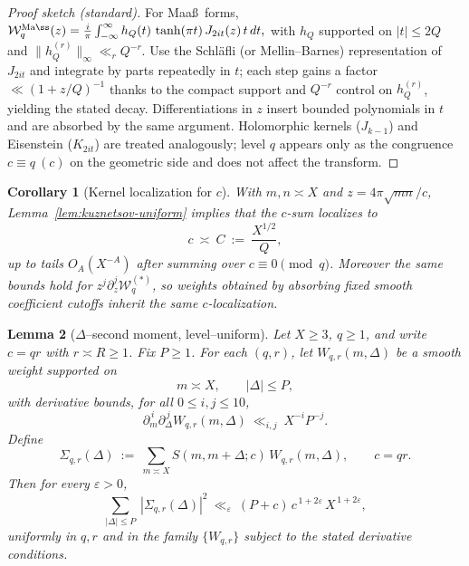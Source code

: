 \documentclass[11pt]{article}
\newtheorem{lemma}{Lemma}[part]
\newtheorem{corollary}[lemma]{Corollary}
\theoremstyle{definition}
\theoremstyle{remark}
\numberwithin{equation}{part}
\begin{document}
\begin{proof}[Proof sketch (standard)]
	For Maa\ss\ forms,
	\(
	\mathcal W_q^{\mathrm{Ma\ss}}(z)=\frac{i}{\pi}\int_{-\infty}^{\infty} h_Q(t)\,\tanh(\pi t)\,J_{2it}(z)\,t\,dt,
	\)
	with $h_Q$ supported on $|t|\le 2Q$ and $\|h_Q^{(r)}\|_\infty\ll_r Q^{-r}$.
	Use the Schl\"afli (or Mellin–Barnes) representation of $J_{2it}$ and integrate by parts repeatedly in $t$;
	each step gains a factor $\ll (1+z/Q)^{-1}$ thanks to the compact support and $Q^{-r}$ control on $h_Q^{(r)}$,
	yielding the stated decay. Differentiations in $z$ insert bounded polynomials in $t$ and are absorbed by the same argument.
	Holomorphic kernels ($J_{k-1}$) and Eisenstein ($K_{2it}$) are treated analogously; level $q$ appears only as the congruence $c\equiv q\ (c)$ on the geometric side and does not affect the transform.
\end{proof}

\begin{corollary}[Kernel localization for $c$]\label{cor:kernel-localization}
	With $m,n\asymp X$ and $z=4\pi\sqrt{mn}/c$, Lemma~\ref{lem:kuznetsov-uniform} implies that the $c$-sum localizes to
	\[
		c\ \asymp\ C\ :=\ \frac{X^{1/2}}{Q},
	\]
	up to tails $O_A(X^{-A})$ after summing over $c\equiv0\pmod q$.
	Moreover the same bounds hold for $z^j\partial_z^j\mathcal W_q^{(*)}$, so weights obtained by absorbing fixed smooth coefficient cutoffs inherit the same $c$-localization.
\end{corollary}




\begin{lemma}[{\boldmath $\Delta$--second moment, level--uniform}]
	\label{lem:delta-second-moment-fullyrigid}
	Let $X\ge 3$, $q\ge 1$, and write $c=qr$ with $r\asymp R\ge 1$.
	Fix $P\ge 1$. For each $(q,r)$, let $W_{q,r}(m,\Delta)$ be a smooth weight supported on
	\[
		m\asymp X,\qquad |\Delta|\le P,
	\]
	with derivative bounds, for all $0\le i,j\le 10$,
	\[
		\partial_m^{\,i}\partial_\Delta^{\,j}W_{q,r}(m,\Delta)\ \ll_{i,j}\ X^{-i}P^{-j}.
	\]
	Define
	\[
		\Sigma_{q,r}(\Delta)\ :=\ \sum_{m\asymp X} S(m,m+\Delta;c)\,W_{q,r}(m,\Delta),
		\qquad c=qr.
	\]
	Then for every $\varepsilon>0$,
	\[
		\sum_{|\Delta|\le P}\ |\Sigma_{q,r}(\Delta)|^2
		\ \ll_{\varepsilon}\ (P+c)\,c^{\,1+2\varepsilon}\,X^{\,1+2\varepsilon},
	\]
	uniformly in $q,r$ and in the family $\{W_{q,r}\}$ subject to the stated derivative conditions.
\end{lemma}
\end{document}
